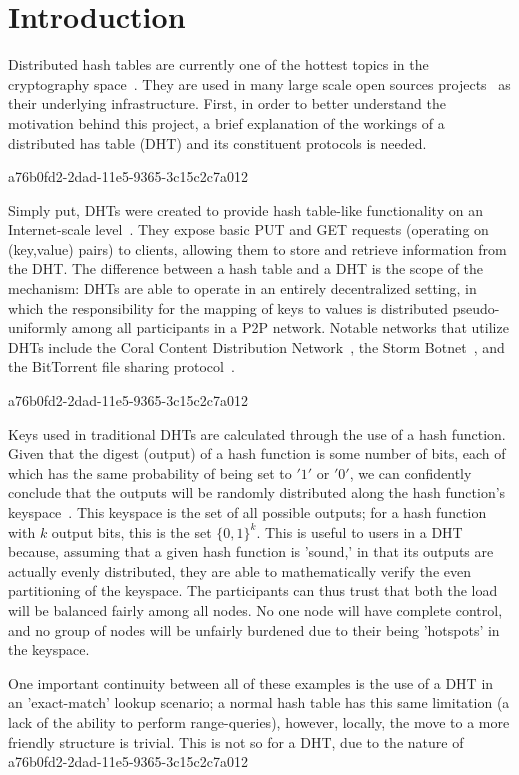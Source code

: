 \documentclass[12pt]{article}
\begin{document}
\section{Introduction}
\par Distributed hash tables are currently one of the hottest topics in the cryptography space~\cite{Stoica:2001dj,Rowstron:2001ea,Ratnasamy:2001wn}. They are used in many large scale open sources projects~\cite{Freitas:2013tb,Xu:2010vs,Perfitt:2010fh} as their underlying infrastructure. First, in order to better understand the motivation behind this project, a brief explanation of the workings of a distributed has table (DHT) and its constituent protocols is needed.

a76b0fd2-2dad-11e5-9365-3c15c2c7a012\par Simply put, DHTs were created to provide hash table-like functionality on an Internet-scale level~\cite{Ratnasamy:2001wn}. They expose basic PUT and GET requests (operating on (key,value) pairs) to clients, allowing them to store and retrieve information from the DHT. The difference between a hash table and a DHT is the scope of the mechanism: DHTs are able to operate in an entirely decentralized setting, in which the responsibility for the mapping of keys to values is distributed pseudo-uniformly among all participants in a P2P network. Notable networks that utilize DHTs include the Coral Content Distribution Network~\cite{Freedman:2004vb}, the Storm Botnet~\cite{Holz:2008uk}, and the BitTorrent file sharing protocol~\cite{Cohen:y1_8mBnw}.

a76b0fd2-2dad-11e5-9365-3c15c2c7a012\par Keys used in traditional DHTs are calculated through the use of a hash function. Given that the digest (output) of a hash function is some number of bits, each of which has the same probability of being set to $'1'$ or $'0'$, we can confidently conclude that the outputs will be randomly distributed along the hash function's keyspace~. This keyspace is the set of all possible outputs; for a hash function with $k$ output bits, this is the set $\{0,1\}^k$. This is useful to users in a DHT because, assuming that a given hash function is 'sound,' in that its outputs are actually evenly distributed, they are able to mathematically verify the even partitioning of the keyspace. The participants can thus trust that both the load will be balanced fairly among all nodes. No one node will have complete control, and no group of nodes will be unfairly burdened due to their being 'hotspots' in the keyspace.~

\par One important continuity between all of these examples is the use of a DHT in an 'exact-match' lookup scenario; a normal hash table has this same limitation (a lack of the ability to perform range-queries), however, locally, the move to a more friendly structure is trivial. This is not so for a DHT, due to the nature of
\printbibliography
a76b0fd2-2dad-11e5-9365-3c15c2c7a012
\end{document}
